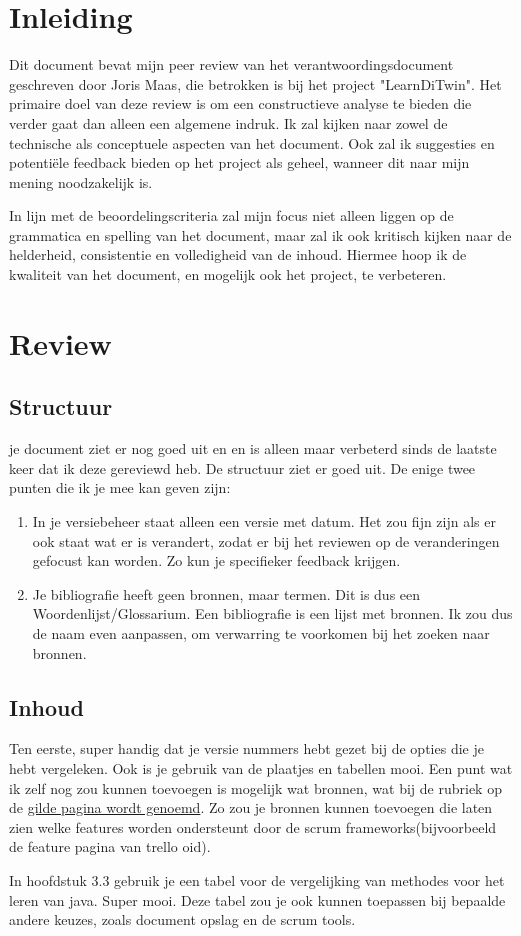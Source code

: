 \documentclass[a4paper]{article}
\begin{document}
\tableofcontents
\pagebreak
\section{Inleiding}
Dit document bevat mijn peer review van het verantwoordingsdocument geschreven door Joris Maas, die betrokken is bij het project "LearnDiTwin". 
Het primaire doel van deze review is om een constructieve analyse te bieden die verder gaat dan alleen een algemene indruk. 
Ik zal kijken naar zowel de technische als conceptuele aspecten van het document. Ook zal ik suggesties en potentiële feedback bieden op het project als geheel, wanneer dit naar mijn mening noodzakelijk is.
\par \smallskip
In lijn met de beoordelingscriteria zal mijn focus niet alleen liggen op de grammatica en spelling van het document, maar zal ik ook kritisch kijken naar de helderheid, consistentie en volledigheid van de inhoud.
Hiermee hoop ik de kwaliteit van het document, en mogelijk ook het project, te verbeteren.


\section{Review}
\subsection{Structuur}
je document ziet er nog goed uit en en is alleen maar verbeterd sinds de laatste keer dat ik deze gereviewd heb.
De structuur ziet er goed uit. De enige twee punten die ik je mee kan geven zijn:
\begin{enumerate}
  \item In je versiebeheer staat alleen een versie met datum. Het zou fijn zijn als er ook staat wat er is verandert, zodat er bij het reviewen op de veranderingen gefocust kan worden. Zo kun je specifieker feedback krijgen.
  \item Je bibliografie heeft geen bronnen, maar termen. Dit is dus een Woordenlijst/Glossarium. Een bibliografie is een lijst met bronnen. Ik zou dus de naam even aanpassen, om verwarring te voorkomen bij het zoeken naar bronnen.
\end{enumerate}

\subsection{Inhoud}
Ten eerste, super handig dat je versie nummers hebt gezet bij de opties die je hebt vergeleken. Ook is je gebruik van de plaatjes en tabellen mooi.
Een punt wat ik zelf nog zou kunnen toevoegen is mogelijk wat bronnen, wat bij de rubriek op de \href{https://canvas.hu.nl/courses/39872/assignments/276343}{gilde pagina wordt genoemd}.
Zo zou je bronnen kunnen toevoegen die laten zien welke features worden ondersteunt door de scrum frameworks(bijvoorbeeld de feature pagina van trello oid).
\par \smallskip 
In hoofdstuk 3.3 gebruik je een tabel voor de vergelijking van methodes voor het leren van java. Super mooi. Deze tabel zou je ook kunnen toepassen bij bepaalde andere keuzes, zoals document opslag en de scrum tools.
\end{document}

